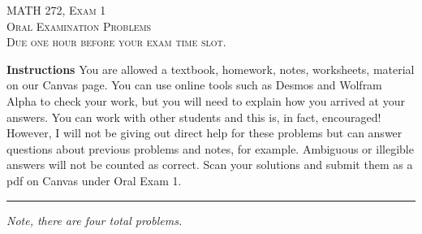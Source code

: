 \documentclass[12pt]{amsbook}
\begin{document}

\begin{center}
   \textsc{\large MATH 272, Exam 1}\\
   \textsc{Oral Examination Problems}\\
   \textsc{Due one hour before your exam time slot.}
\end{center}

\vspace{1cm}

\noindent\textbf{Instructions} \; You are allowed a textbook, homework, notes, worksheets, material on our Canvas page.  You can use online tools such as Desmos and Wolfram Alpha to check your work, but you will need to explain how you arrived at your answers.  You can work with other students and this is, in fact, encouraged! However, I will not be giving out direct help for these problems but can answer questions about previous problems and notes, for example. Ambiguous or illegible answers will not be counted as correct. Scan your solutions and submit them as a pdf on Canvas under Oral Exam 1.  


\vspace{1cm}


\hrule

\vspace*{1cm}
\noindent\emph{Note, there are four total problems.}

\newpage
\end{document}
